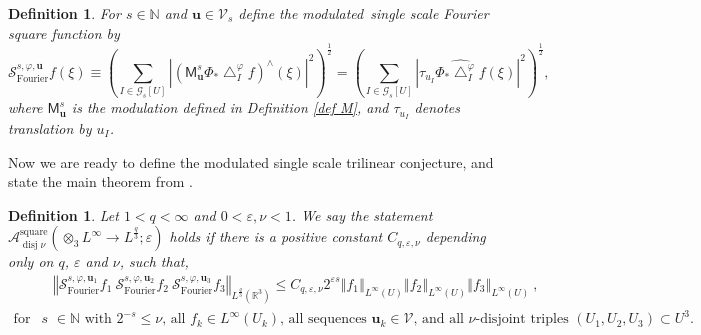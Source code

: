\documentclass{amsart}%
\theoremstyle{plain}
\newtheorem{definition}[theorem]{Definition}
\numberwithin{equation}{section}
\begin{document}
\begin{definition}
For $s\in\mathbb{N}$ and $\mathbf{u}\in\mathcal{V}_{s}$ define the
\emph{modulated\ single scale }Fourier square function by
\begin{equation}
\mathcal{S}_{\operatorname*{Fourier}}^{s,\varphi,\mathbf{u}}f\left(
\xi\right)  \equiv\left(  \sum_{I\in\mathcal{G}_{s}\left[  U\right]
}\left\vert \left(  \mathsf{M}_{\mathbf{u}}^{s}\Phi_{\ast}\bigtriangleup
_{I}^{\varphi}f\right)  ^{\wedge}\left(  \xi\right)  \right\vert ^{2}\right)
^{\frac{1}{2}}=\left(  \sum_{I\in\mathcal{G}_{s}\left[  U\right]  }\left\vert
\tau_{u_{I}}\widehat{\Phi_{\ast}\bigtriangleup_{I}^{\varphi}f}\left(
\xi\right)  \right\vert ^{2}\right)  ^{\frac{1}{2}},\label{def Four square}%
\end{equation}
where $\mathsf{M}_{\mathbf{u}}^{s}$ is the modulation defined in Definition
\ref{def M}, and $\tau_{u_{I}}$ denotes translation by $u_{I}$.
\end{definition}

Now we are ready to define the modulated single scale trilinear conjecture,
and state the main theorem from \cite{RiSa2}.

\begin{definition}
\label{def A}Let $1<q<\infty$ and $0<\varepsilon,\nu<1$. We say the statement
$\mathcal{A}_{\operatorname*{disj}\nu}^{\operatorname*{square}}\left(
\otimes_{3}L^{\infty}\rightarrow L^{\frac{q}{3}};\varepsilon\right)  $ holds
if there is a positive constant $C_{q,\varepsilon,\nu}$ depending only on $q$,
$\varepsilon$ and $\nu$, such that,%
\begin{align}
&  \left\Vert \mathcal{S}_{\operatorname*{Fourier}}^{s,\varphi,\mathbf{u}_{1}%
}f_{1}\ \mathcal{S}_{\operatorname*{Fourier}}^{s,\varphi,\mathbf{u}_{2}}%
f_{2}\ \mathcal{S}_{\operatorname*{Fourier}}^{s,\varphi,\mathbf{u}_{3}}%
f_{3}\right\Vert _{L^{\frac{q}{3}}\left(  \mathbb{R}^{3}\right)  }\leq
C_{q,\varepsilon,\nu}2^{\varepsilon s}\left\Vert f_{1}\right\Vert _{L^{\infty
}\left(  U\right)  }\left\Vert f_{2}\right\Vert _{L^{\infty}\left(  U\right)
}\left\Vert f_{3}\right\Vert _{L^{\infty}\left(  U\right)  }%
\ ,\label{single tri Four}\\
\text{for all }s &  \in\mathbb{N}\text{ with }2^{-s}\leq\nu\text{, all }%
f_{k}\in L^{\infty}\left(  U_{k}\right)  \text{, all sequences }\mathbf{u}%
_{k}\in\mathcal{V}\text{, and all }\nu\text{-disjoint triples }\left(
U_{1},U_{2},U_{3}\right)  \subset U^{3}.\nonumber
\end{align}

\end{definition}
\end{document}
